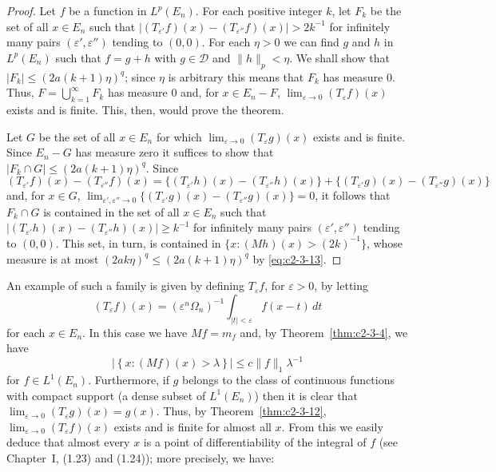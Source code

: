 \begin{proof}
Let $f$ be a function in $L^p(E_n)$. For each positive integer $k$, let $F_k$ be the set of all $x \in E_n$ such that $|(T_{\varepsilon'} f)(x) - (T_{\varepsilon''} f)(x)| > 2k^{-1}$ for infinitely many pairs $(\varepsilon', \varepsilon'')$ tending to $(0, 0)$. For each $\eta > 0$ we can find $g$ and $h$ in $L^p(E_n)$ such that $f = g + h$ with $g \in \mathcal{D}$ and $\|h\|_p < \eta$. We shall show that $|F_k| \leq (2a(k+1)\eta)^q$; since $\eta$ is arbitrary this means that $F_k$ has measure $0$. Thus, $F = \bigcup_{k=1}^\infty F_k$ has measure $0$ and, for $x \in E_n - F$, $\lim_{\varepsilon \to 0} (T_\varepsilon f)(x)$ exists and is finite. This, then, would prove the theorem.

Let $G$ be the set of all $x \in E_n$ for which $\lim_{\varepsilon \to 0} (T_\varepsilon g)(x)$ exists and is finite. Since $E_n - G$ has measure zero it suffices to show that $|F_k \cap G| \leq (2a(k+1)\eta)^q$. Since
\[
(T_{\varepsilon'} f)(x) - (T_{\varepsilon''} f)(x) = \{(T_{\varepsilon'} h)(x) - (T_{\varepsilon''} h)(x)\} + \{(T_{\varepsilon'} g)(x) - (T_{\varepsilon''} g)(x)\}
\]
and, for $x \in G$, $\lim_{\varepsilon', \varepsilon'' \to 0} \{(T_{\varepsilon'} g)(x) - (T_{\varepsilon''} g)(x)\} = 0$, it follows that $F_k \cap G$ is contained in the set of all $x \in E_n$ such that $|(T_{\varepsilon'} h)(x) - (T_{\varepsilon''} h)(x)| \geq k^{-1}$ for infinitely many pairs $(\varepsilon', \varepsilon'')$ tending to $(0,0)$. This set, in turn, is contained in $\{x : (Mh)(x) > (2k)^{-1}\}$, whose measure is at most $(2a k \eta)^q \leq (2a(k+1)\eta)^q$ by \eqref{eq:c2-3-13}.
\end{proof}

An example of such a family is given by defining $T_\varepsilon f$, for $\varepsilon > 0$, by letting
\[
(T_\varepsilon f)(x) = (\varepsilon^n \Omega_n)^{-1} \int_{|t| < \varepsilon} f(x - t)\,dt
\]
for each $x \in E_n$. In this case we have $Mf = m_f$ and, by Theorem~\ref{thm:c2-3-4}, we have
\[
\left|\left\{x : (Mf)(x) > \lambda\right\}\right| \leq c\|f\|_1 \lambda^{-1}
\]
for $f \in L^1(E_n)$. Furthermore, if $g$ belongs to the class of continuous functions with compact support (a dense subset of $L^1(E_n)$) then it is clear that $\lim_{\varepsilon \to 0} (T_\varepsilon g)(x) = g(x)$. Thus, by Theorem~\ref{thm:c2-3-12}, $\lim_{\varepsilon \to 0} (T_\varepsilon f)(x)$ exists and is finite for almost all $x$. From this we easily deduce that almost every $x$ is a point of differentiability of the integral of $f$ (see Chapter~I, (1.23) and (1.24)); more precisely, we have:

